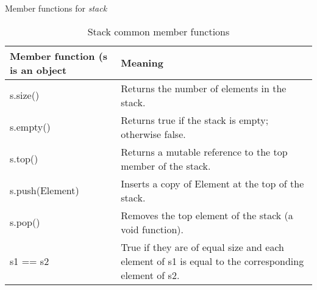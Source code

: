 \noindent
Member functions for \emph{stack}
\begin{table}[H]
\begin{center}
\renewcommand{\arraystretch}{1.8}
\begin{tabular}{ m{4.5cm} m{11cm}} 
\textbf{Member function (s is an object} & \textbf{Meaning}\\
\hline

s.size() & Returns the number of elements in the stack.\\
\hline

s.empty() & Returns true if the stack is empty; otherwise false.\\
\hline

s.top() & Returns a mutable reference to the top member of the stack.\\
\hline

s.push(Element) & Inserts a copy of Element at the top of the stack.\\
\hline

s.pop() & Removes the top element of the stack (a void function).\\
\hline

s1 == s2 & True if they are of equal size and each element of s1 is
equal to the corresponding element of s2.\\
\hline
\end{tabular}
\end{center}
\caption{Stack common member functions}
\label{table_1}
\end{table}

